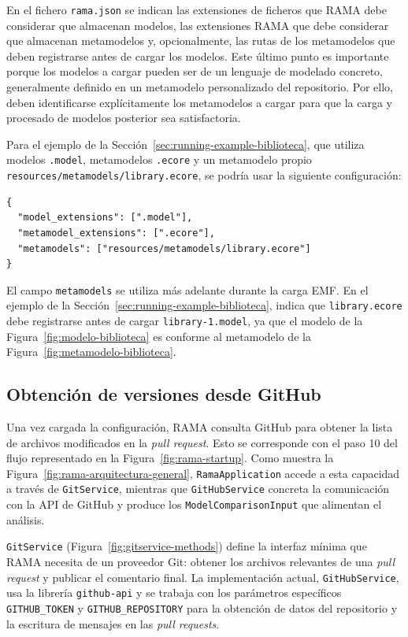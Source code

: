 \documentclass[11pt]{article}
\begin{document}
En el fichero \texttt{rama.json} se indican las extensiones de ficheros que RAMA debe considerar que almacenan modelos, las extensiones RAMA que debe considerar que almacenan metamodelos y, opcionalmente, las rutas de los metamodelos que deben registrarse antes de cargar los modelos. Este último punto es importante porque los modelos a cargar pueden ser de un lenguaje de modelado concreto, generalmente definido en un metamodelo personalizado del repositorio. Por ello, deben identificarse explícitamente los metamodelos a cargar para que la carga y procesado de modelos posterior sea satisfactoria.

Para el ejemplo de la Sección~\ref{sec:running-example-biblioteca}, que utiliza modelos \texttt{.model}, metamodelos \texttt{.ecore} y un metamodelo propio \texttt{resources/metamodels/library.ecore}, se podría usar la siguiente configuración:

\begin{lstlisting}[caption={Ejemplo de configuración de RAMA.},label={lst:rama-config}]
{
  "model_extensions": [".model"],
  "metamodel_extensions": [".ecore"],
  "metamodels": ["resources/metamodels/library.ecore"]
}
\end{lstlisting}

El campo \texttt{metamodels} se utiliza más adelante durante la carga EMF. En el ejemplo de la Sección~\ref{sec:running-example-biblioteca}, indica que \texttt{library.ecore} debe registrarse antes de cargar \texttt{library-1.model}, ya que el modelo de la Figura~\ref{fig:modelo-biblioteca} es conforme al metamodelo de la Figura~\ref{fig:metamodelo-biblioteca}.

\subsection{Obtención de versiones desde GitHub}

Una vez cargada la configuración, RAMA consulta GitHub para obtener la lista de archivos modificados en la \textit{pull request}. Esto se corresponde con el paso 10 del flujo representado en la Figura~\ref{fig:rama-startup}. Como muestra la Figura~\ref{fig:rama-arquitectura-general}, \texttt{RamaApplication} accede a esta capacidad a través de \texttt{GitService}, mientras que \texttt{GitHubService} concreta la comunicación con la API de GitHub y produce los \texttt{ModelComparisonInput} que alimentan el análisis.

\texttt{GitService} (Figura~\ref{fig:gitservice-methods}) define la interfaz mínima que RAMA necesita de un proveedor Git: obtener los archivos relevantes de una \textit{pull request} y publicar el comentario final. La implementación actual, \texttt{GitHubService}, usa la librería \texttt{github-api} y se trabaja con los parámetros específicos \texttt{GITHUB\_TOKEN} y \texttt{GITHUB\_REPOSITORY} para la obtención de datos del repositorio y la escritura de mensajes en las \textit{pull requests}.
\end{document}
